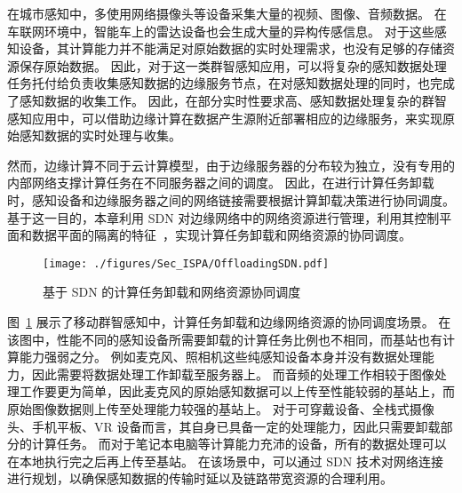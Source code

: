 
在城市感知中，多使用网络摄像头等设备采集大量的视频、图像、音频数据。
在车联网环境中，智能车上的雷达设备也会生成大量的异构传感信息。
对于这些感知设备，其计算能力并不能满足对原始数据的实时处理需求，也没有足够的存储资源保存原始数据。
因此，对于这一类群智感知应用，可以将复杂的感知数据处理任务托付给负责收集感知数据的边缘服务节点，在对感知数据处理的同时，也完成了感知数据的收集工作。
因此，在部分实时性要求高、感知数据处理复杂的群智感知应用中，可以借助边缘计算在数据产生源附近部署相应的边缘服务，来实现原始感知数据的实时处理与收集。

然而，边缘计算不同于云计算模型，由于边缘服务器的分布较为独立，没有专用的内部网络支撑计算任务在不同服务器之间的调度。
因此，在进行计算任务卸载时，感知设备和边缘服务器之间的网络链接需要根据计算卸载决策进行协同调度。
基于这一目的，本章利用 SDN 对边缘网络中的网络资源进行管理，利用其控制平面和数据平面的隔离的特征~\cite{Committee:2012un}，实现计算任务卸载和网络资源的协同调度。


\begin{figure}[!h]
  \centering
  \texttt{[image: ./figures/Sec\_ISPA/OffloadingSDN.pdf]}
  \vspace{-1em}
  \caption{基于 SDN 的计算任务卸载和网络资源协同调度}
  \vspace{-1em}
  \label{fig_OffloadingSDN}
\end{figure}

图~\ref{fig_OffloadingSDN} 展示了移动群智感知中，计算任务卸载和边缘网络资源的协同调度场景。
在该图中，性能不同的感知设备所需要卸载的计算任务比例也不相同，而基站也有计算能力强弱之分。
例如麦克风、照相机这些纯感知设备本身并没有数据处理能力，因此需要将数据处理工作卸载至服务器上。
而音频的处理工作相较于图像处理工作要更为简单，因此麦克风的原始感知数据可以上传至性能较弱的基站上，而原始图像数据则上传至处理能力较强的基站上。
对于可穿戴设备、全栈式摄像头、手机平板、VR 设备而言，其自身已具备一定的处理能力，因此只需要卸载部分的计算任务。
而对于笔记本电脑等计算能力充沛的设备，所有的数据处理可以在本地执行完之后再上传至基站。
在该场景中，可以通过 SDN 技术对网络连接进行规划，以确保感知数据的传输时延以及链路带宽资源的合理利用。

